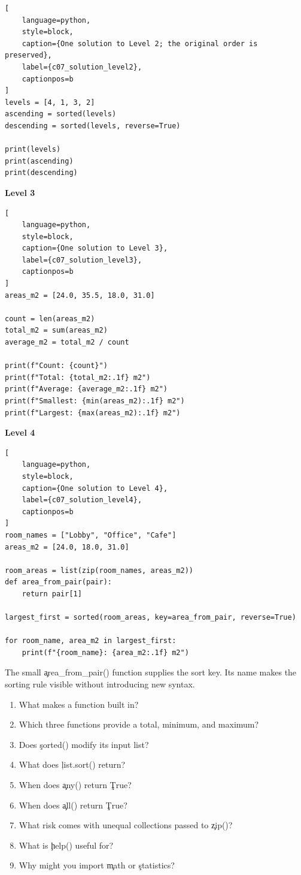 \begin{lstlisting}[
    language=python,
    style=block,
    caption={One solution to Level 2; the original order is preserved},
    label={c07_solution_level2},
    captionpos=b
]
levels = [4, 1, 3, 2]
ascending = sorted(levels)
descending = sorted(levels, reverse=True)

print(levels)
print(ascending)
print(descending)
\end{lstlisting}

\textbf{Level 3}

\begin{lstlisting}[
    language=python,
    style=block,
    caption={One solution to Level 3},
    label={c07_solution_level3},
    captionpos=b
]
areas_m2 = [24.0, 35.5, 18.0, 31.0]

count = len(areas_m2)
total_m2 = sum(areas_m2)
average_m2 = total_m2 / count

print(f"Count: {count}")
print(f"Total: {total_m2:.1f} m2")
print(f"Average: {average_m2:.1f} m2")
print(f"Smallest: {min(areas_m2):.1f} m2")
print(f"Largest: {max(areas_m2):.1f} m2")
\end{lstlisting}

\textbf{Level 4}

\begin{lstlisting}[
    language=python,
    style=block,
    caption={One solution to Level 4},
    label={c07_solution_level4},
    captionpos=b
]
room_names = ["Lobby", "Office", "Cafe"]
areas_m2 = [24.0, 18.0, 31.0]

room_areas = list(zip(room_names, areas_m2))
def area_from_pair(pair):
    return pair[1]

largest_first = sorted(room_areas, key=area_from_pair, reverse=True)

for room_name, area_m2 in largest_first:
    print(f"{room_name}: {area_m2:.1f} m2")
\end{lstlisting}

The small \c{area_from_pair()} function supplies the sort key. Its name makes
the sorting rule visible without introducing new syntax.


\begin{enumerate}
    \item What makes a function built in?
    \item Which three functions provide a total, minimum, and maximum?
    \item Does \c{sorted()} modify its input list?
    \item What does \c{list.sort()} return?
    \item When does \c{any()} return \c{True}?
    \item When does \c{all()} return \c{True}?
    \item What risk comes with unequal collections passed to \c{zip()}?
    \item What is \c{help()} useful for?
    \item Why might you import \c{math} or \c{statistics}?
\end{enumerate}

